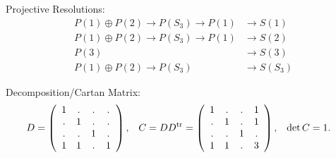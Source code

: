 \documentclass[12pt,a4paper]{amsart}
\begin{document}
Projective Resolutions:
\begin{align*}
P(1) \oplus P(2) \to P(S_3) \to P(1)  & \to S(1) \\
P(1) \oplus P(2) \to P(S_3) \to P(1)  & \to S(2) \\
P(3) & \to S(3) \\
P(1) \oplus P(2) \to P(S_3) & \to S(S_3)
\end{align*}

Decomposition/Cartan Matrix:
\begin{align*}
  D &= \left(
  \begin{array}{cccc}
    1&.&.&.\\
    .&1&.&.\\
    .&.&1&.\\
    1&1&.&1
  \end{array}
  \right)\text,&
C = D D^{\mathrm{tr}} &= \left(
  \begin{array}{cccc}
    1&.&.&1\\
    .&1&.&1\\
    .&.&1&.\\
    1&1&.&3
  \end{array}
  \right)\text,&
\det C &= 1\text.
\end{align*}

\newpage
\scriptsize
\end{document}

